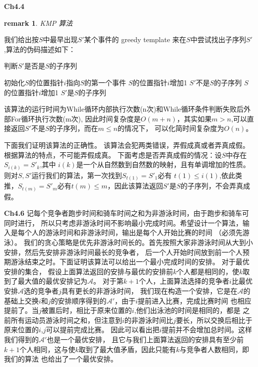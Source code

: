 \documentclass{article}
\newtheorem{remark}{remark}
\begin{document}
\textbf{Ch4.4}

\begin{remark}
KMP 算法
\end{remark}

我们给出按$S$中最早出现$S'$某个事件的 greedy template 来在$S$中尝试找出子序列$S'$,算法的伪码描述如下：
\begin{algorithm}
\caption{判断$S'$是否是$S$的子序列}
\begin{algorithmic}[1]
\STATE 初始化$S$的位置指针$i$指向$S$的第一个事件
       \STATE $S$的位置指针$i$增加1
          \RETURN $S'$不是$S$的子序列
       \ENDIF
    \ENDWHILE
    \STATE $S$的位置指针$i$增加1    
\ENDFOR
\RETURN $S'$是$S$的子序列
\end{algorithmic}
\end{algorithm}

该算法的运行时间为While循环内部执行次数(n次)和While循环条件判断失败后外部For循环执行次数(m次),
因此时间复杂度是$O(m+n)$，其实如果$m>n$,可以直接返回$S'$不是$S$的子序列，而在$m\leq n$的情况下，
可以化简时间复杂度为$O(n)$。
 
下面我们证明该算法的正确性。
该算法会犯两类错误，弄假成真或者弄真成假。根据算法的特点，不可能弄假成真。
下面考虑是否弄真成假的情况：设$S$中存在$S_{i(k)}=S'_k$,其中
$i(k)$是一个从自然数到自然数的映射，且有单调增加的性质。则对$S,S'$运行我们的算法，第一次找到$S_{t(1)}=S'_1$必有
$t(1)\leq i(1)$,依此类推，$S_{t(m)}=S'_m$必有$t(m)\leq m$，因此该算法返回$S'$是$S$的子序列，不会弄真成假。

\textbf{Ch4.6}
记每个竞争者跑步时间和骑车时间之和为非游泳时间，由于跑步和骑车可同时进行，
所以只考虑非游泳时间不影响最小完成时间。希望设计一个算法，输入是每个人的游泳时间和非游泳时间，输出是每个人开始比赛的时间
（必须先游泳）。
我们的贪心策略是优先非游泳时间长的。首先按照大家非游泳时间从大到小安排，然后先安排非游泳时间最长的竞争者，
后一个人开始时间放到前一个人预期游泳结束之时。下面证明该算法可以给出一个最小完成时间的安排。
对于最优安排的集合，
假设上面算法返回的安排与最优的安排前$k$个人都是相同的，使$k$取到了最大值的最优安排记为$\mathcal{A}$。
对于第$k+1$个人，上面算法选择的竞争者$i$比最优安排$\mathcal{A}$选的竞争者$j$具有更长的非游泳时间，
我们现在构造一个安排，它是在$\mathcal{A}$的基础上交换$i$和$j$的安排顺序得到的$\mathcal{A'}$，由于$i$提前进入比赛，完成比赛时间
也相应提前了。当$j$被置后时，相比于原来位置的$i$,他们出泳池的时间是相同的，都是
之前所有运动员游泳时间之和，但注意到$i$的非游泳时间比$j$要长，所以交换后相比于原来位置的$i$,$j$可以提前完成比赛。
因此可以看出把$i$提前并不会增加总时间。这样我们得到的$\mathcal{A'}$也是一个最优安排，
且它与我们上面算法返回的安排具有至少前$k+1$个人相同，这与使$k$取到了最大值矛盾，因此只能有$k$与竞争者人数相同，即我们的算法
也给出了一个最优安排。
\end{document}
